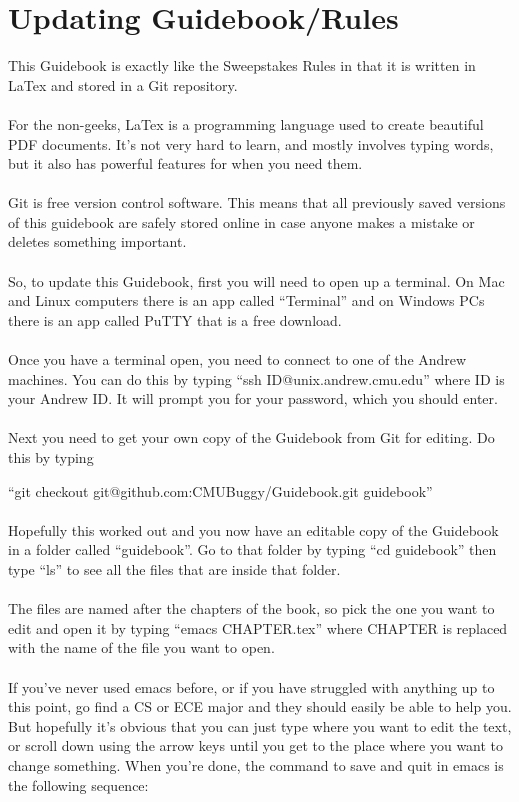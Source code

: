\section{Updating Guidebook/Rules}
\label{sec:Updating}
This Guidebook is exactly like the Sweepstakes Rules in that it is written in
LaTex and stored in a Git repository.
\\\\
For the non-geeks, LaTex is a programming language used to create beautiful
PDF documents. It's not very hard to learn, and mostly involves typing words,
but it also has powerful features for when you need them.
\\\\
Git is free version control software. This means that all previously saved
versions of this guidebook are safely stored online in case anyone makes a
mistake or deletes something important.
\\\\
So, to update this Guidebook, first you will need to open up a terminal.
On Mac and Linux computers there is an app called ``Terminal'' and on Windows
PCs there is an app called PuTTY that is a free download.
\\\\
Once you have a terminal open, you need to connect to one of the Andrew
machines. You can do this by typing ``ssh ID@unix.andrew.cmu.edu''
where ID is your Andrew ID. It will prompt you for your password,
which you should enter.
\\\\
Next you need to get your own copy of the Guidebook from Git for editing.
Do this by typing

``git checkout git@github.com:CMUBuggy/Guidebook.git guidebook''
\\\\
Hopefully this worked out and you now have an editable copy of the Guidebook
in a folder called ``guidebook''. Go to that folder by typing ``cd guidebook''
then type ``ls'' to see all the files that are inside that folder.
\\\\
The files are named after the chapters of the book, so pick the one you
want to edit and open it by typing ``emacs CHAPTER.tex'' where CHAPTER is
replaced with the name of the file you want to open.
\\\\
If you've never used emacs before, or if you have struggled with anything up
to this point, go find a CS or ECE major and they should easily be able to
help you. But hopefully it's obvious that you can just type where you want to
edit the text, or scroll down using the arrow keys until you get to the place
where you want to change something. When you're done, the command to save and
quit in emacs is the following sequence:

